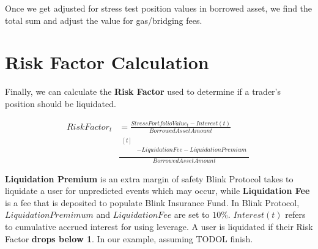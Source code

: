 \documentclass[conference]{IEEEtran}
\begin{document}
 Once we get adjusted for stress test position values in borrowed asset, we find the total sum and adjust the value for gas/bridging fees.
 
 \section{Risk Factor Calculation}
 Finally, we can calculate the \textbf{Risk Factor} used to determine if a trader’s position should be liquidated. 
 
\begin{align}
RiskFactor_{t} &= \frac{StressPortfolioValue_{t}-Interest(t)}{BorrowedAssetAmount} \nonumber \\
& \frac{\begin{aligned}[t] \\
  &-LiquidationFee - LiquidationPremium \\
  \end{aligned}}{BorrowedAssetAmount} \nonumber \
\end{align}
 
 \textbf{Liquidation Premium} is an extra margin of safety Blink Protocol takes to liquidate a user for unpredicted events which may occur, while \textbf{Liquidation Fee} is a fee that is deposited to populate Blink Insurance Fund. In Blink Protocol, $LiquidationPremimum$ and $LiquidationFee$ are set to $10\%$. $Interest(t)$ refers to cumulative accrued interest for using leverage. A user is liquidated if their Risk Factor \textbf{drops below 1}. In our example, assuming TODOL finish.




\newpage
\end{document}

